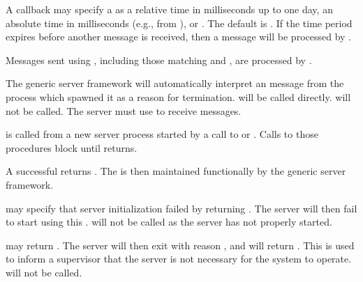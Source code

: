 A callback may specify a  as a relative time in
milliseconds up to one day, an absolute time in milliseconds (e.g.,
from ), or . The default
 is . If the time period expires before
another message is received, then a  message will be
processed by .

Messages sent using , including those matching
and ,
are processed by .

The generic server framework will automatically interpret an
 message from the process which spawned it as a reason
for termination.  will be called
directly.  will not be called. The server must use
 to receive  messages.

\begin{procedure}
\end{procedure}
\returns{}

\begin{argtbl}
\end{argtbl}

 is called from a new server process
started by a call to  or .
Calls to those procedures block until  returns.

A successful  returns . The  is then maintained
functionally by the generic server framework.

 may specify that server initialization failed by
returning . The server will then fail to
start using this .  will not be called
as the server has not properly started.

 may return . The server will then exit
with reason , and  will
return . This is used to inform a
supervisor that the server is not necessary
for the system to operate.  will not be called.

